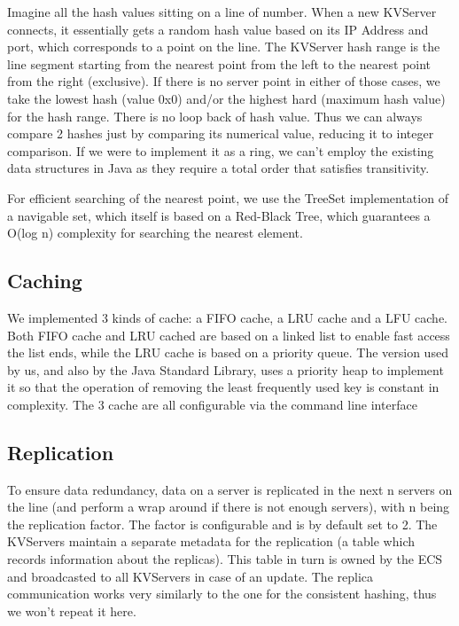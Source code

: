 \documentclass[sigconf]{acmart}
\begin{document}
Imagine all the hash values sitting on a line of number. When a new KVServer connects, it essentially gets a random hash value based on its IP Address and port, which corresponds to a point on the line. The KVServer hash range is the line segment starting from the nearest point from the left to the nearest point from the right (exclusive). If there is no server point in either of those cases, we take the lowest hash (value 0x0) and/or the highest hard (maximum hash value) for the hash range. There is no loop back of hash value. Thus we can always compare 2 hashes just by comparing its numerical value, reducing it to integer comparison. If we were to implement it as a ring, we can't employ the existing data structures in Java as they require a total order that satisfies transitivity.

For efficient searching of the nearest point, we use the TreeSet implementation of a navigable set, which itself is based on a Red-Black Tree, which guarantees a O(log n) complexity for searching the nearest element. \cite{tree}

\subsection{Caching}
We implemented 3 kinds of cache: a FIFO cache, a LRU cache and a LFU cache. Both FIFO cache and LRU cached are based on a linked list to enable fast access the list ends, while the LRU cache is based on a priority queue. The version used by us, and also by the Java Standard Library, uses a priority heap to implement it \cite{heap}  so that the operation of removing the least frequently used key is constant in complexity. \cite{heapcomplexity} The 3 cache are all configurable via the command line interface

\subsection{Replication}
To ensure data redundancy, data on a server is replicated in the next n servers on the line (and perform a wrap around if there is not enough servers), with n being the replication factor. The factor is configurable and is by default set to 2. The KVServers maintain a separate metadata for the replication (a table which records information about the replicas). This table in turn is owned by the ECS and broadcasted to all KVServers in case of an update. The replica communication works very similarly to the one for the consistent hashing, thus we won't repeat it here.
\end{document}
